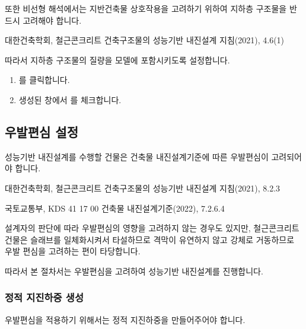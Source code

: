 \documentclass[a4paper,11pt,korean,openany,oneside]{sphinxmanual}
\begin{document}
\sphinxAtStartPar
또한 비선형 해석에서는 지반\sphinxhyphen{}건축물 상호작용을 고려하기 위하여 지하층 구조물을 반드시 고려해야 합니다. %
\begin{footnote}[2]\sphinxAtStartFootnote
대한건축학회, 철근콘크리트 건축구조물의 성능기반 내진설계 지침(2021), 4.6\sphinxhyphen{}(1)
%
\end{footnote}
따라서 지하층 구조물의 질량을 모델에 포함시키도록 설정합니다.

\begin{sphinxShadowBox}
\begin{enumerate}
%
\item {} 
\sphinxAtStartPar
{} \sphinxhyphen{}  \sphinxhyphen{} 를 클릭합니다.

\item {} 
\sphinxAtStartPar
생성된 창에서 를 체크합니다.


\end{enumerate}
\end{sphinxShadowBox}


\subsection{우발편심 설정}
\label{\detokenize{1_mass_ecc_setting:id5}}
\sphinxAtStartPar
성능기반 내진설계를 수행할 건물은 건축물 내진설계기준에 따른 우발편심이 고려되어야 합니다. %
\begin{footnote}[3]\sphinxAtStartFootnote
대한건축학회, 철근콘크리트 건축구조물의 성능기반 내진설계 지침(2021), 8.2.3

\sphinxAtStartPar
국토교통부, KDS 41 17 00 건축물 내진설계기준(2022), 7.2.6.4
%
\end{footnote}
설계자의 판단에 따라 우발편심의 영향을 고려하지 않는 경우도 있지만,
철근콘크리트 건물은 슬래브를 일체화시켜서 타설하므로 격막이 유연하지 않고 강체로 거동하므로 우발 편심을 고려하는 편이 타당합니다.

\sphinxAtStartPar
따라서 본 절차서는 우발편심을 고려하여 성능기반 내진설계를 진행합니다.


\subsubsection{정적 지진하중 생성}
\label{\detokenize{1_mass_ecc_setting:id7}}
\sphinxAtStartPar
우발편심을 적용하기 위해서는 정적 지진하중을 만들어주어야 합니다.
\end{document}
